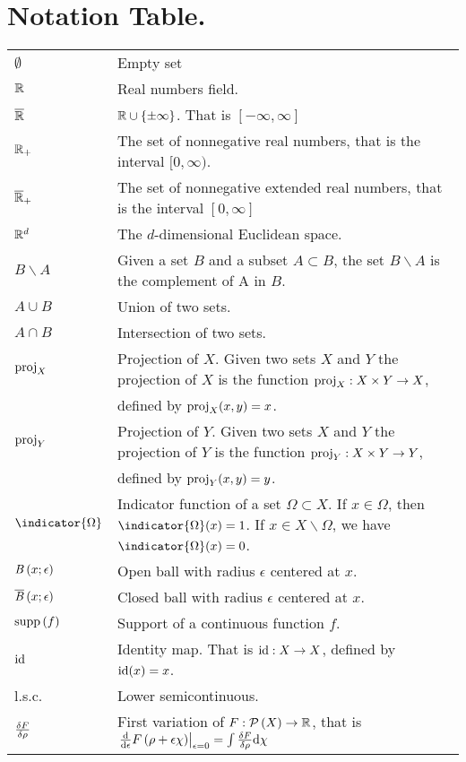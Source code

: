 \chapter*{Notation Table.}
\begin{tabular}{ l l }
	$\emptyset$ & Empty set \\
	$\mathbb{R}$ & Real numbers field. \\ 
	$\overline{\mathbb{R}}$ & $ \mathbb{R} \cup \left\lbrace \pm\infty \right\rbrace$. That is $[-\infty, \infty]$ \\
	$\mathbb{R}_+ $ & The set of nonnegative real numbers, that is the interval $[0, \infty)$.\\
	$\overline{\mathbb{R}}_+$ & The set of nonnegative extended real numbers, that is the interval $[0, \infty]$\\
	$\mathbb{R}^d $ & The $d$-dimensional Euclidean space.\\
	$B\backslash A$ & Given a set $B$ and a subset $A\subset B$, the set $B\backslash A$ is the complement of A in $B$.\\
	$A\cup B$ & Union of two sets.\\
	$A\cap B$ & Intersection of two sets.\\
	$\mathrm{proj}_X$& Projection of $X$. Given two sets $X$ and $Y$ the projection of $X$ is the function $\mathrm{proj}_X:X\times Y\rightarrow X$, \\
	& defined by $\mathrm{proj}_X(x,y)=x$.\\
	$\mathrm{proj}_Y$& Projection of $Y$. Given two sets $X$ and $Y$ the projection of $Y$ is the function $\mathrm{proj}_Y:X\times Y\rightarrow Y$,\\
	&  defined by $\mathrm{proj}_Y(x,y)=y$.\\
	$\indicator{\Omega} $ & Indicator function of a set $\Omega\subset X$. If $x\in \Omega$, then $\indicator{\Omega}(x)=1$. If $x\in X\backslash\Omega$, we have $\indicator{\Omega}(x)=0$.\\
	$\mathit{B}\left( x; \epsilon \right)$ & Open ball with radius $\epsilon$ centered at $x$.\\
	$\overline{\mathit{B}}\left( x;\epsilon \right) $ & Closed ball with radius $\epsilon$ centered at $x$.\\
	$\mathrm{supp}\,(f)$ & Support of a continuous function $f$.\\
	$\mathrm{id}$ & Identity map. That is $\mathrm{id}: X\rightarrow X$, defined by $\mathrm{id}(x)=x$.\\
	l.s.c. & Lower semicontinuous. \\
	$\frac{\delta F}{\delta \rho}$ &  First variation of $F:\mathcal{P}\left( X \right) \rightarrow \mathbb{R}$, that is $\left.\frac{\mathrm{d}}{\mathrm{d}\epsilon}F\left(\rho +\epsilon\chi\right)\right|_{\epsilon=0}=\int\frac{\delta F}{\delta \rho}\mathrm{d}\chi$\\

\end{tabular}
